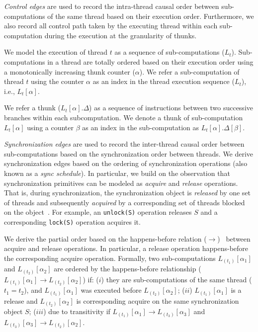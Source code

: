  

 {\em Control edges}  are used to record the intra-thread causal order between sub-computations of the same thread
based on their execution order. Furthermore, we also record all control path taken by the executing thread within each sub-computation during the execution at the granularity of {thunks}.  

We model the execution of thread $t$ as a sequence of sub-computations ($L_t$).  Sub-computations in a thread are totally ordered based on their execution order using a monotonically increasing thunk counter ($\alpha$). We refer a sub-computation of thread $t$ using the counter $\alpha$ as an index in the thread execution sequence ($L_t$), i.e., $L_t[\alpha]$.  

We refer a thunk ($L_t[\alpha].\Delta$) as a sequence of instructions between two successive branches within each subcomputation. We denote a thunk of sub-computation $L_t[\alpha]$ using a counter $\beta$ as an index in the sub-computation as $L_t[\alpha].\Delta[\beta]$.  


  {\em Synchronization edges}   are
used to record the inter-thread causal order between sub-computations based on the synchronization order between threads. 
We derive synchronization edges based on the ordering of synchronization operations (also known as a {\em sync schedule}). In particular,  we build on the observation that synchronization primitives can be modeled as {\em acquire} and {\em release} operations. That is,   during synchronization, the synchronization object is {\em released} by one set of threads and subsequently  {\em acquired} by a corresponding set of threads blocked on the object~\cite{fast-track-pldi}. For example, an {\tt unlock(S)} operation releases $S$
and a corresponding {\tt lock(S)} operation acquires it.



We derive the partial order based on the happens-before relation
($\rightarrow$)~\cite{djit,fast-track-pldi} between acquire and release operations. In particular, a release
operation happens-before the corresponding acquire operation.
Formally, two sub-computations $L_{(t_1)}[\alpha_1]$ and
$L_{(t_2)}[\alpha_2]$ are ordered by the happens-before relationship ($L_{(t_1)}[\alpha_1] \rightarrow
L_{(t_2)}[\alpha_2]$) if:  ($i$)  they are sub-computations of the
same thread ($t_1 = t_2$), and $L_{(t_1)}[\alpha_1]$ was executed before $L_{(t_2)}[\alpha_2]$; ($ii$)  $L_{(t_1)}[\alpha_1]$  is a release and $L_{(t_2)}[\alpha_2]$ is corresponding acquire on the same synchronization object $S$; ($iii$) due to transitivity if  
 $L_{(t_1)}[\alpha_1] \rightarrow L_{(t_3)}[\alpha_3] $ and $L_{(t_3)}[\alpha_3]  \rightarrow L_{(t_2)}[\alpha_2]$.


